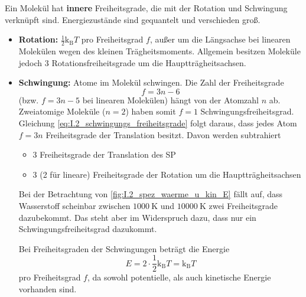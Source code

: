     Ein Molekül hat \textbf{innere} Freiheitsgrade, die mit der Rotation und Schwingung verknüpft sind. Energiezustände sind gequantelt und verschieden groß.
    \begin{itemize}
    	\item \textbf{Rotation:} $\frac{1}{2} \mathrm{k}_\mathrm{B} T $ pro Freiheitsgrad $f$, außer um die Längsachse bei linearen Molekülen wegen des kleinen Trägheitsmoments. Allgemein besitzen Moleküle jedoch 3 Rotationsfreiheitsgrade um die Hauptträgheitsachsen.
    	\item \textbf{Schwingung:} Atome im Molekül schwingen. Die Zahl der Freiheitsgrade 
        \begin{equation}
            f=3n-6
            \label{eq:I.2_schwingungs_freiheitsgrade}
        \end{equation}
        (bzw. $f=3n-5$ bei linearen Molekülen) hängt von der Atomzahl $n$ ab. Zweiatomige Moleküle ($n=2$) haben somit $f=1$ Schwingungsfreiheitsgrad.\\

    	Gleichung \eqref{eq:I.2_schwingungs_freiheitsgrade} folgt daraus, dass jedes Atom $f=3n$ Freiheitsgrade der Translation besitzt. Davon werden subtrahiert
        \begin{itemize}
        	\item 3 Freiheitsgrade der Translation des SP
        	\item 3 (2 für lineare) Freiheitsgrade der Rotation um die Hauptträgheitsachsen
        \end{itemize}
        \begin{verbal}
            Bei der Betrachtung von \autoref{fig:I.2_spez_waerme_u_kin_E} fällt auf, dass Wasserstoff scheinbar zwischen $\SI{1000}{\kelvin}$ und $\SI{10000}{\kelvin}$ zwei Freiheitsgrade dazubekommt. Das steht aber im Widerspruch dazu, dass nur ein Schwingungsfreiheitsgrad dazukommt.
        \end{verbal}
        Bei Freiheitsgraden der Schwingungen beträgt die Energie
        $$
        E = 2 \cdot \frac{1}{2} \mathrm{k}_\mathrm{B} T = \mathrm{k}_\mathrm{B}T
        $$ 
        pro Freiheitsgrad $f$, da sowohl potentielle, als auch kinetische Energie vorhanden sind.
        \end{itemize}

